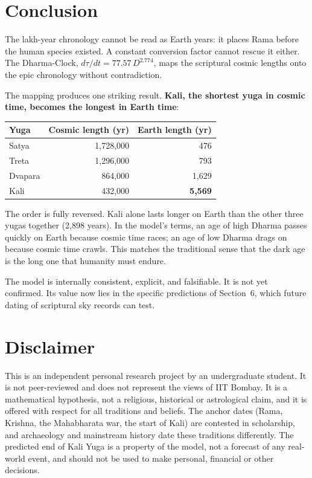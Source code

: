 \documentclass[11pt,a4paper]{article}
\begin{document}
\section{Conclusion}

The lakh-year chronology cannot be read as Earth years: it places Rama before the human species existed. A constant conversion factor cannot rescue it either. The Dharma-Clock, $d\tau/dt = 77.57\,D^{2.774}$, maps the scriptural cosmic lengths onto the epic chronology without contradiction.

The mapping produces one striking result. \textbf{Kali, the shortest yuga in cosmic time, becomes the longest in Earth time}:

\begin{center}
\begin{tabular}{@{}lrr@{}}
\toprule
Yuga & Cosmic length (yr) & Earth length (yr) \\
\midrule
Satya   & 1{,}728{,}000 & 476 \\
Treta   & 1{,}296{,}000 & 793 \\
Dvapara & 864{,}000     & 1{,}629 \\
Kali    & 432{,}000     & \textbf{5{,}569} \\
\bottomrule
\end{tabular}
\end{center}

\noindent The order is fully reversed. Kali alone lasts longer on Earth than the other three yugas together (2{,}898 years). In the model's terms, an age of high Dharma passes quickly on Earth because cosmic time races; an age of low Dharma drags on because cosmic time crawls. This matches the traditional sense that the dark age is the long one that humanity must endure.

The model is internally consistent, explicit, and falsifiable. It is not yet confirmed. Its value now lies in the specific predictions of Section~6, which future dating of scriptural sky records can test.

\section*{Disclaimer}
\small
This is an independent personal research project by an undergraduate student. It is not peer-reviewed and does not represent the views of IIT Bombay. It is a mathematical hypothesis, not a religious, historical or astrological claim, and it is offered with respect for all traditions and beliefs. The anchor dates (Rama, Krishna, the Mahabharata war, the start of Kali) are contested in scholarship, and archaeology and mainstream history date these traditions differently. The predicted end of Kali Yuga is a property of the model, not a forecast of any real-world event, and should not be used to make personal, financial or other decisions.
\end{document}
